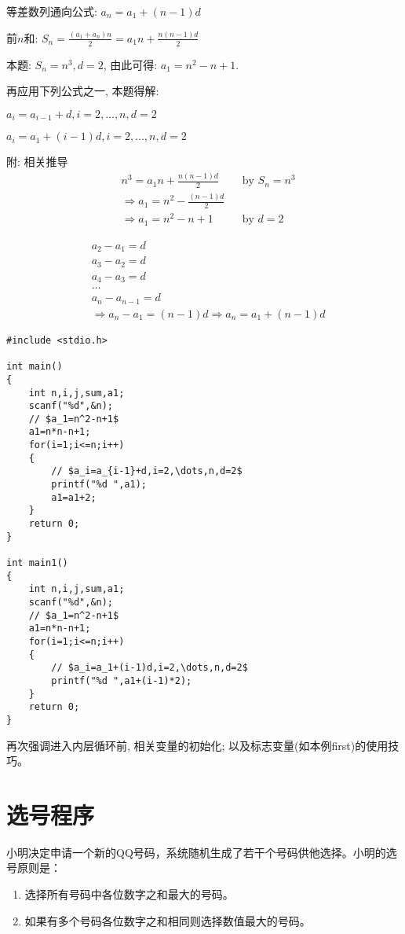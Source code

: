 等差数列通向公式: $a_n=a_1+(n-1)d$

前$n$和: $S_n=\frac{(a_1+a_n)n}{2}=a_1n+\frac{n(n-1)d}{2}$

本题: $S_n=n^3, d=2$, 由此可得: $a_1=n^2-n+1$.

再应用下列公式之一, 本题得解:

$a_i=a_{i-1}+d,i=2,\dots,n,d=2$

$a_i=a_1+(i-1)d,i=2,\dots,n,d=2$

附: 相关推导
\begin{align*}
&n^3=a_1n+\frac{n(n-1)d}{2} &&\text{by }S_n=n^3\\
&\Rightarrow a_1=n^2-\frac{(n-1)d}{2}\\
&\Rightarrow a_1=n^2-n+1 &&\text{by }d=2
\end{align*}

\begin{align*}
&a_2-a_1=d\\
&a_3-a_2=d\\
&a_4-a_3=d\\
&\dots\\
&a_{n}-a_{n-1}=d\\
&\Rightarrow a_n-a_1=(n-1)d\Rightarrow a_n=a_1+(n-1)d
\end{align*}

\begin{lstlisting}
#include <stdio.h>

int main()
{
	int n,i,j,sum,a1;
	scanf("%d",&n);
	// $a_1=n^2-n+1$
	a1=n*n-n+1;
	for(i=1;i<=n;i++)
	{   
		// $a_i=a_{i-1}+d,i=2,\dots,n,d=2$
		printf("%d ",a1);
		a1=a1+2; 
	}
	return 0;
} 

int main1()
{
	int n,i,j,sum,a1;
	scanf("%d",&n);
	// $a_1=n^2-n+1$
	a1=n*n-n+1;
	for(i=1;i<=n;i++)
	{
		// $a_i=a_1+(i-1)d,i=2,\dots,n,d=2$
		printf("%d ",a1+(i-1)*2);
	}
	return 0;
} 
\end{lstlisting}


\begin{note}[要点]
	再次强调进入内层循环前, 相关变量的初始化; 以及标志变量(如本例first)的使用技巧。
\end{note}

\section{选号程序}\label{qq}
小明决定申请一个新的QQ号码，系统随机生成了若干个号码供他选择。小明的选号原则是：
\begin{enumerate}
	\item 选择所有号码中各位数字之和最大的号码。
	\item 如果有多个号码各位数字之和相同则选择数值最大的号码。
\end{enumerate}

